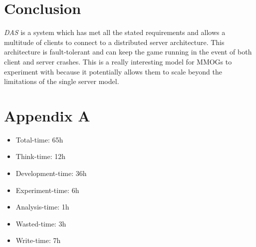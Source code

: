 \documentclass{article}
\begin{document}
\section{Conclusion}
\label{sec:conclusion}

\textit{DAS} is a system which has met all the stated requirements and allows a multitude of clients to connect to a distributed server architecture. This architecture is fault-tolerant and can keep the game running in the event of both client and server crashes. This is a really interesting model for MMOGs to experiment with because it potentially allows them to scale beyond the limitations of the single server model.

\section{Appendix A}

\begin{itemize}
\item Total-time: 65h
\item Think-time: 12h
\item Development-time: 36h
\item Experiment-time: 6h
\item Analysis-time: 1h
\item Wasted-time: 3h
\item Write-time: 7h
\end{itemize}
\end{document}
